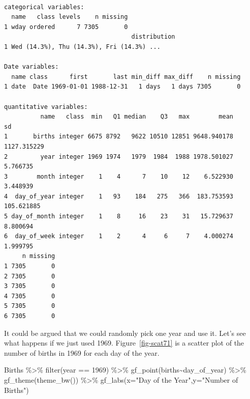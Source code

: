 \documentclass[
  letterpaper,
  DIV=11,
  numbers=noendperiod]{scrreprt}
\newenvironment{Shaded}{\begin{snugshade}}{\end{snugshade}}
\newcommand{\AttributeTok}[1]{\textcolor[rgb]{0.40,0.45,0.13}{#1}}
\newcommand{\DecValTok}[1]{\textcolor[rgb]{0.68,0.00,0.00}{#1}}
\newcommand{\FunctionTok}[1]{\textcolor[rgb]{0.28,0.35,0.67}{#1}}
\newcommand{\NormalTok}[1]{\textcolor[rgb]{0.00,0.23,0.31}{#1}}
\newcommand{\SpecialCharTok}[1]{\textcolor[rgb]{0.37,0.37,0.37}{#1}}
\newcommand{\StringTok}[1]{\textcolor[rgb]{0.13,0.47,0.30}{#1}}
\begin{document}
\begin{verbatim}

categorical variables:  
  name   class levels    n missing
1 wday ordered      7 7305       0
                                   distribution
1 Wed (14.3%), Thu (14.3%), Fri (14.3%) ...    

Date variables:  
  name class      first       last min_diff max_diff    n missing
1 date  Date 1969-01-01 1988-12-31   1 days   1 days 7305       0

quantitative variables:  
          name   class  min   Q1 median    Q3   max        mean          sd
1       births integer 6675 8792   9622 10510 12851 9648.940178 1127.315229
2         year integer 1969 1974   1979  1984  1988 1978.501027    5.766735
3        month integer    1    4      7    10    12    6.522930    3.448939
4  day_of_year integer    1   93    184   275   366  183.753593  105.621885
5 day_of_month integer    1    8     16    23    31   15.729637    8.800694
6  day_of_week integer    1    2      4     6     7    4.000274    1.999795
     n missing
1 7305       0
2 7305       0
3 7305       0
4 7305       0
5 7305       0
6 7305       0
\end{verbatim}

It could be argued that we could randomly pick one year and use it.
Let's see what happens if we just used 1969. Figure~\ref{fig-scat71} is
a scatter plot of the number of births in 1969 for each day of the year.

\begin{Shaded}
\begin{Highlighting}[]
\NormalTok{Births }\SpecialCharTok{\%\textgreater{}\%}
  \FunctionTok{filter}\NormalTok{(year }\SpecialCharTok{==} \DecValTok{1969}\NormalTok{) }\SpecialCharTok{\%\textgreater{}\%}
  \FunctionTok{gf\_point}\NormalTok{(births}\SpecialCharTok{\textasciitilde{}}\NormalTok{day\_of\_year) }\SpecialCharTok{\%\textgreater{}\%}
  \FunctionTok{gf\_theme}\NormalTok{(}\FunctionTok{theme\_bw}\NormalTok{()) }\SpecialCharTok{\%\textgreater{}\%}
  \FunctionTok{gf\_labs}\NormalTok{(}\AttributeTok{x=}\StringTok{"Day of the Year"}\NormalTok{,}\AttributeTok{y=}\StringTok{"Number of Births"}\NormalTok{)}
\end{Highlighting}
\end{Shaded}
\end{document}

